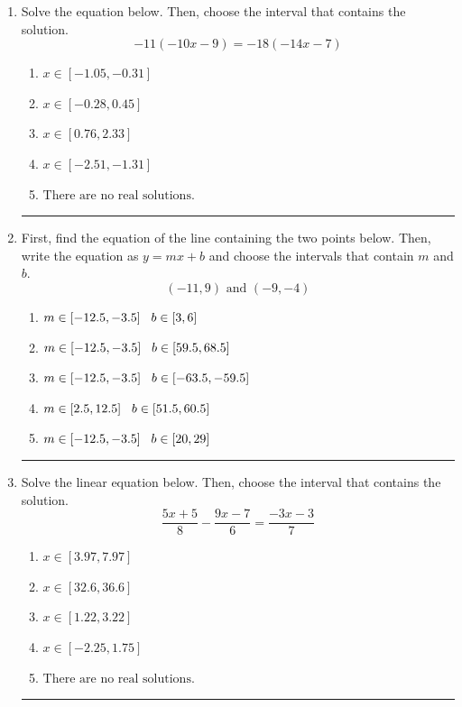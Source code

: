 \documentclass[14pt]{extbook}
\newcommand{\litem}[1]{\item#1\hspace*{-1cm}\rule{\textwidth}{0.4pt}}
\begin{document}
\begin{enumerate}
{\begin{enumerate}[label=\Alph*.]
\end{enumerate} }
\litem{
Solve the equation below. Then, choose the interval that contains the solution.\[ -11(-10x -9) = -18(-14x -7) \]\begin{enumerate}[label=\Alph*.]
\item \( x \in [-1.05, -0.31] \)
\item \( x \in [-0.28, 0.45] \)
\item \( x \in [0.76, 2.33] \)
\item \( x \in [-2.51, -1.31] \)
\item \( \text{There are no real solutions.} \)

\end{enumerate} }
\litem{
First, find the equation of the line containing the two points below. Then, write the equation as $ y=mx+b $ and choose the intervals that contain $m$ and $b$.\[ (-11, 9) \text{ and } (-9, -4) \]\begin{enumerate}[label=\Alph*.]
\item \( m \in [-12.5, -3.5] \hspace*{3mm} b \in [3, 6] \)
\item \( m \in [-12.5, -3.5] \hspace*{3mm} b \in [59.5, 68.5] \)
\item \( m \in [-12.5, -3.5] \hspace*{3mm} b \in [-63.5, -59.5] \)
\item \( m \in [2.5, 12.5] \hspace*{3mm} b \in [51.5, 60.5] \)
\item \( m \in [-12.5, -3.5] \hspace*{3mm} b \in [20, 29] \)

\end{enumerate} }
\litem{
Solve the linear equation below. Then, choose the interval that contains the solution.\[ \frac{5x + 5}{8} - \frac{9x -7}{6} = \frac{-3x -3}{7} \]\begin{enumerate}[label=\Alph*.]
\item \( x \in [3.97, 7.97] \)
\item \( x \in [32.6, 36.6] \)
\item \( x \in [1.22, 3.22] \)
\item \( x \in [-2.25, 1.75] \)
\item \( \text{There are no real solutions.} \)


\end{enumerate}}
\end{enumerate}
\end{document}
